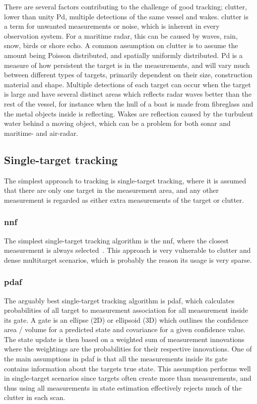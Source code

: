 There are several factors contributing to the challenge of good tracking; \gls{clutter}, lower than unity \gls{Pd}, multiple detections of the same vessel and wakes. \Gls{clutter} is a term for unwanted measurements or noise, which is inherent in every observation system. For a maritime radar, this can be caused by waves, rain, snow, birds or shore echo. A common assumption on clutter is to assume the amount being Poisson distributed, and spatially uniformly distributed. \gls{Pd} is a measure of how persistent the target is in the measurements, and will vary much between different types of targets, primarily dependent on their size, construction material and shape. Multiple detections of each target can occur when the target is large and have several distinct areas which reflects radar waves better than the rest of the vessel, for instance when the hull of a boat is made from fibreglass and the metal objects inside is reflecting. Wakes are reflection caused by the turbulent water behind a moving object, which can be a problem for both sonar and maritime- and air-radar.

\subsection{Single-target tracking}
The simplest approach to tracking is single-target tracking, where it is assumed that there are only one target in the measurement area, and any other measurement is regarded as either extra measurements of the target or \gls{clutter}. 

\subsubsection*{\gls{nnf}}
The simplest single-target tracking algorithm is the \gls{nnf}, where the closest measurement is always selected~\cite{Bar-Shalom1998}. This approach is very vulnerable to clutter and dense multitarget scenarios, which is probably the reason its usage is very sparse. 

\subsubsection*{\gls{pdaf}}
The arguably best single-target tracking algorithm is \gls{pdaf}, which calculates probabilities of all target to measurement association for all measurement inside its gate. A gate is an ellipse (2D) or ellipsoid (3D) which outlines the confidence area / volume for a predicted state and covariance for a given confidence value. The state update is then based on a weighted sum of measurement innovations where the weightings are the probabilities for their respective innovations. One of the main assumptions in \gls{pdaf} is that all the measurements inside its gate contains information about the targets true state. This assumption performs well in single-target scenarios since targets often create more than measurements, and thus using all measurements in state estimation effectively rejects much of the \gls{clutter} in each \gls{scan}.

